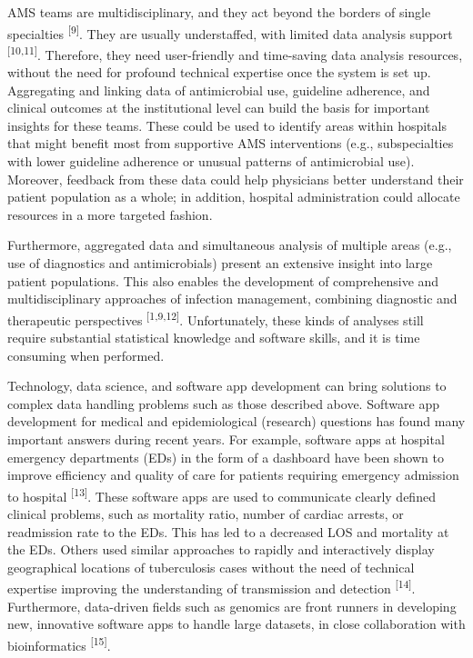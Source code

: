 \documentclass[
]{book}
\begin{document}
AMS teams are multidisciplinary, and they act beyond the borders of single specialties \textsuperscript{{[}9{]}}. They are usually understaffed, with limited data analysis support \textsuperscript{{[}10,11{]}}. Therefore, they need user-friendly and time-saving data analysis resources, without the need for profound technical expertise once the system is set up. Aggregating and linking data of antimicrobial use, guideline adherence, and clinical outcomes at the institutional level can build the basis for important insights for these teams. These could be used to identify areas within hospitals that might benefit most from supportive AMS interventions (e.g., subspecialties with lower guideline adherence or unusual patterns of antimicrobial use). Moreover, feedback from these data could help physicians better understand their patient population as a whole; in addition, hospital administration could allocate resources in a more targeted fashion.

Furthermore, aggregated data and simultaneous analysis of multiple areas (e.g., use of diagnostics and antimicrobials) present an extensive insight into large patient populations. This also enables the development of comprehensive and multidisciplinary approaches of infection management, combining diagnostic and therapeutic perspectives \textsuperscript{{[}1,9,12{]}}. Unfortunately, these kinds of analyses still require substantial statistical knowledge and software skills, and it is time consuming when performed.

Technology, data science, and software app development can bring solutions to complex data handling problems such as those described above. Software app development for medical and epidemiological (research) questions has found many important answers during recent years. For example, software apps at hospital emergency departments (EDs) in the form of a dashboard have been shown to improve efficiency and quality of care for patients requiring emergency admission to hospital \textsuperscript{{[}13{]}}. These software apps are used to communicate clearly defined clinical problems, such as mortality ratio, number of cardiac arrests, or readmission rate to the EDs. This has led to a decreased LOS and mortality at the EDs. Others used similar approaches to rapidly and interactively display geographical locations of tuberculosis cases without the need of technical expertise improving the understanding of transmission and detection \textsuperscript{{[}14{]}}. Furthermore, data-driven fields such as genomics are front runners in developing new, innovative software apps to handle large datasets, in close collaboration with bioinformatics \textsuperscript{{[}15{]}}.
\end{document}
